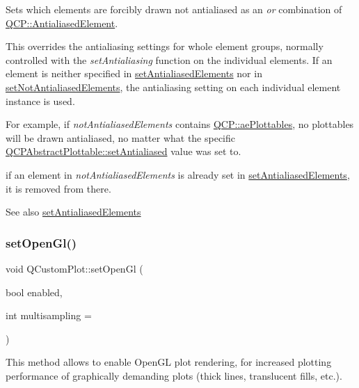 Sets which elements are forcibly drawn not antialiased as an {\itshape or} combination of \mbox{\hyperlink{namespace_q_c_p_ae55dbe315d41fe80f29ba88100843a0c}{Q\+C\+P\+::\+Antialiased\+Element}}.

This overrides the antialiasing settings for whole element groups, normally controlled with the {\itshape set\+Antialiasing} function on the individual elements. If an element is neither specified in \mbox{\hyperlink{class_q_custom_plot_af6f91e5eab1be85f67c556e98c3745e8}{set\+Antialiased\+Elements}} nor in \mbox{\hyperlink{class_q_custom_plot_ae10d685b5eabea2999fb8775ca173c24}{set\+Not\+Antialiased\+Elements}}, the antialiasing setting on each individual element instance is used.

For example, if {\itshape not\+Antialiased\+Elements} contains \mbox{\hyperlink{namespace_q_c_p_ae55dbe315d41fe80f29ba88100843a0ca4145e4251b0cf2dbedabeea0a38f84f6}{Q\+C\+P\+::ae\+Plottables}}, no plottables will be drawn antialiased, no matter what the specific \mbox{\hyperlink{class_q_c_p_layerable_a4fd43e89be4a553ead41652565ff0581}{Q\+C\+P\+Abstract\+Plottable\+::set\+Antialiased}} value was set to.

if an element in {\itshape not\+Antialiased\+Elements} is already set in \mbox{\hyperlink{class_q_custom_plot_af6f91e5eab1be85f67c556e98c3745e8}{set\+Antialiased\+Elements}}, it is removed from there.

\begin{DoxySeeAlso}{See also}
\mbox{\hyperlink{class_q_custom_plot_af6f91e5eab1be85f67c556e98c3745e8}{set\+Antialiased\+Elements}} 
\end{DoxySeeAlso}
\mbox{\label{class_q_custom_plot_a7db1adc09016329f3aef7c60da935789}} 
\subsubsection{\texorpdfstring{set\+Open\+Gl()}{setOpenGl()}}
{\footnotesize\ttfamily void Q\+Custom\+Plot\+::set\+Open\+Gl (\begin{DoxyParamCaption}\item[{bool}]{enabled,  }\item[{int}]{multisampling = {} }\end{DoxyParamCaption})}

This method allows to enable Open\+GL plot rendering, for increased plotting performance of graphically demanding plots (thick lines, translucent fills, etc.).

